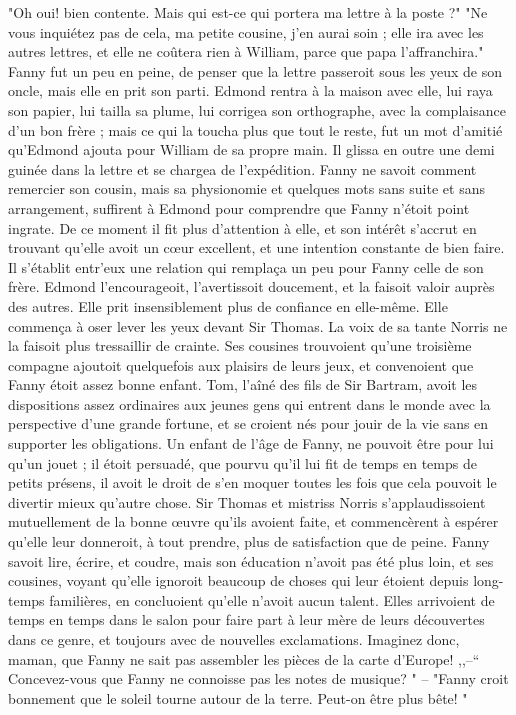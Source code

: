 "Oh oui! bien contente. Mais qui est-ce qui portera ma lettre à la poste ?"
"Ne vous inquiétez pas de cela, ma petite cousine, j’en aurai soin ; elle ira avec les autres lettres, et elle ne coûtera rien à William, parce que papa l’affranchira."
Fanny fut un peu en peine, de penser que la lettre passeroit sous les yeux de son oncle, mais elle en prit son parti. Edmond rentra à la maison avec elle, lui raya son papier, lui tailla sa plume, lui corrigea son orthographe, avec la complaisance d’un bon frère ; mais ce qui la toucha plus que tout le reste, fut un mot d’amitié qu’Edmond ajouta pour William de sa propre main. Il glissa en outre une demi guinée dans la lettre et se chargea de l’expédition.
Fanny ne savoit comment remercier son cousin, mais sa physionomie et quelques mots sans suite et sans arrangement, suffirent à Edmond pour comprendre que Fanny n’étoit\setcounter{page}{500} point ingrate. De ce moment il fit plus d'attention à elle, et son intérêt s'accrut en trouvant qu'elle avoit un cœur excellent, et une intention constante de bien faire. Il s'établit entr'eux une relation qui remplaça un peu pour Fanny celle de son frère. Edmond l'encourageoit, l'avertissoit doucement, et la faisoit valoir auprès des autres.
Elle prit insensiblement plus de confiance en elle-même. Elle commença à oser lever les yeux devant Sir Thomas. La voix de sa tante Norris ne la faisoit plus tressaillir de crainte. Ses cousines trouvoient qu'une troisième compagne ajoutoit quelquefois aux plaisirs de leurs jeux, et convenoient que Fanny étoit assez bonne enfant. Tom, l'aîné des fils de Sir Bartram, avoit les dispositions assez ordinaires aux jeunes gens qui entrent dans le monde avec la perspective d'une grande fortune, et se croient nés pour jouir de la vie sans en supporter les obligations. Un enfant de l'âge de Fanny, ne pouvoit être pour lui qu'un jouet ; il étoit persuadé, que pourvu qu'il lui fit de temps en temps de petits présens, il avoit le droit de s'en moquer toutes les fois que cela pouvoit le divertir mieux qu'autre chose.
Sir Thomas et mistriss Norris s'applaudissoient mutuellement de la bonne œuvre qu'ils\setcounter{page}{501} avoient faite, et commencèrent à espérer qu'elle leur donneroit, à tout prendre, plus de satisfaction que de peine. Fanny savoit lire, écrire, et coudre, mais son éducation n'avoit pas été plus loin, et ses cousines, voyant qu'elle ignoroit beaucoup de choses qui leur étoient depuis long-temps familières, en concluoient qu'elle n'avoit aucun talent. Elles arrivoient de temps en temps dans le salon pour faire part à leur mère de leurs découvertes dans ce genre, et toujours avec de nouvelles exclamations. Imaginez donc, maman, que Fanny ne sait pas assembler les pièces de la carte d'Europe! ,,--`` Concevez-vous que Fanny ne connoisse pas les notes de musique? " -- "Fanny croit bonnement que le soleil tourne autour de la terre. Peut-on être plus bête! "
